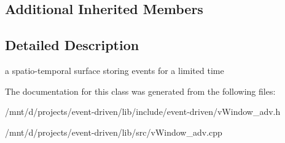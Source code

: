 \subsection*{Additional Inherited Members}


\subsection{Detailed Description}
a spatio-\/temporal surface storing events for a limited time 

The documentation for this class was generated from the following files\+:\begin{DoxyCompactItemize}
\item 
/mnt/d/projects/event-\/driven/lib/include/event-\/driven/v\+Window\+\_\+adv.\+h\item 
/mnt/d/projects/event-\/driven/lib/src/v\+Window\+\_\+adv.\+cpp\end{DoxyCompactItemize}
